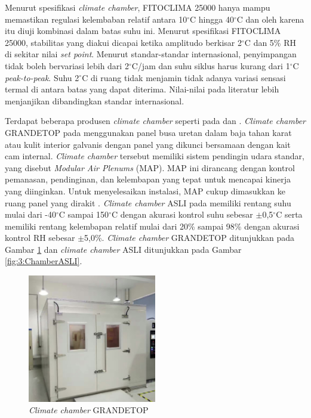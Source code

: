 Menurut spesifikasi \textit{climate chamber}, FITOCLIMA 25000 hanya mampu memastikan regulasi kelembaban relatif antara 10$^\circ$C hingga 40$^\circ$C dan oleh karena itu diuji kombinasi dalam batas suhu ini. Menurut spesifikasi FITOCLIMA 25000, stabilitas yang diakui dicapai ketika amplitudo berkisar 2$^\circ$C dan 5\% RH di sekitar nilai \textit{set point}. Menurut standar-standar internasional, penyimpangan tidak boleh bervariasi lebih dari 2$^\circ$C/jam dan suhu siklus harus kurang dari 1$^\circ$C \textit{peak-to-peak}. Suhu 2$^\circ$C di ruang tidak menjamin tidak adanya variasi sensasi termal di antara batas yang dapat diterima. Nilai-nilai pada literatur lebih menjanjikan dibandingkan standar internasional. \cite{paperChamber}

Terdapat beberapa produsen \textit{climate chamber} seperti pada \cite{ChamberGrande} dan \cite{ChamberASLI}. \textit{Climate chamber} GRANDETOP pada \cite{ChamberGrande} menggunakan panel busa uretan dalam baja tahan karat atau kulit interior galvanis dengan panel yang dikunci bersamaan dengan kait cam internal. \textit{Climate chamber} tersebut memiliki sistem pendingin udara standar, yang disebut \textit{Modular Air Plenums} (MAP). MAP ini dirancang dengan kontrol pemanasan, pendinginan, dan kelembapan yang tepat untuk mencapai kinerja yang diinginkan. Untuk menyelesaikan instalasi, MAP cukup dimasukkan ke ruang panel yang dirakit \cite{ChamberGrande}. \textit{Climate chamber} ASLI pada \cite{ChamberASLI} memiliki rentang suhu mulai dari -40$^\circ$C sampai 150$^\circ$C dengan akurasi kontrol suhu sebesar $\pm$0,5$^\circ$C serta memiliki rentang kelembapan relatif mulai dari 20\% sampai 98\% dengan akurasi kontrol RH sebesar $\pm$5,0\%. \textit{Climate chamber} GRANDETOP ditunjukkan pada Gambar \ref{fig:3:ChamberGRANDETOP} dan \textit{climate chamber} ASLI ditunjukkan pada Gambar \ref{fig:3:ChamberASLI}. %

\begin{figure}[!h]
	\centering
	\includegraphics[width=0.5\textwidth]{figures/ChamberGRANDETOP}
	\caption{\textit{Climate chamber} GRANDETOP \cite{ChamberGrande}}
	\label{fig:3:ChamberGRANDETOP}
\end{figure}

